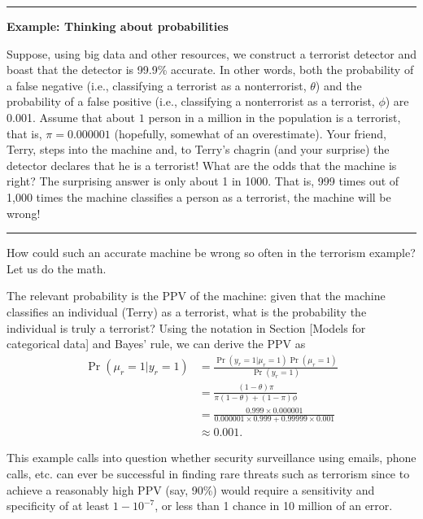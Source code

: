 \documentclass[]{krantz}
\begin{document}
\begin{center}\rule{0.5\linewidth}{\linethickness}\end{center}

\textbf{Example: Thinking about probabilities}

Suppose, using big data and other resources, we construct a terrorist
detector and boast that the detector is 99.9\% accurate. In other words,
both the probability of a false negative (i.e., classifying a terrorist
as a nonterrorist, \(\theta\)) and the probability of a false positive
(i.e., classifying a nonterrorist as a terrorist, \(\phi\)) are 0.001.
Assume that about \(1\) person in a million in the population is a
terrorist, that is, \(\pi = 0.000001\) (hopefully, somewhat of an
overestimate). Your friend, Terry, steps into the machine and, to
Terry's chagrin (and your surprise) the detector declares that he is a
terrorist! What are the odds that the machine is right? The surprising
answer is only about 1 in 1000. That is, 999 times out of 1,000 times
the machine classifies a person as a terrorist, the machine will be
wrong!

\begin{center}\rule{0.5\linewidth}{\linethickness}\end{center}

How could such an accurate machine be wrong so often in the terrorism
example? Let us do the math.

The relevant probability is the PPV of the machine: given that the
machine classifies an individual (Terry) as a terrorist, what is the
probability the individual is truly a terrorist? Using the notation in
Section {[}Models for categorical data{]} and Bayes' rule, we can derive
the PPV as \[\begin{aligned}
\Pr (\mu_r = 1\vert y_r = 1) &=  \frac{\Pr (y_r = 1\vert \mu_r =
1)\Pr(\mu_r = 1)}{\Pr (y_r = 1)} \\
&= \frac{(1 - \theta )\pi }{\pi (1 - \theta ) + (1 - \pi )\phi } \\
&=  \frac{0.999\times 0.000001}{0.000001\times 0.999 + 0.99999\times 0.001} \\
 &\approx  0.001.\end{aligned}\]

This example calls into question whether security surveillance using
emails, phone calls, etc. can ever be successful in finding rare threats
such as terrorism since to achieve a reasonably high PPV (say, 90\%)
would require a sensitivity and specificity of at least \(1-10^{-7}\),
or less than 1 chance in 10 million of an error.
\end{document}
